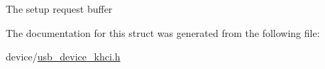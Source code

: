 The setup request buffer 

The documentation for this struct was generated from the following file\-:\begin{DoxyCompactItemize}
\item 
device/\hyperlink{usb__device__khci_8h}{usb\-\_\-device\-\_\-khci.\-h}\end{DoxyCompactItemize}

